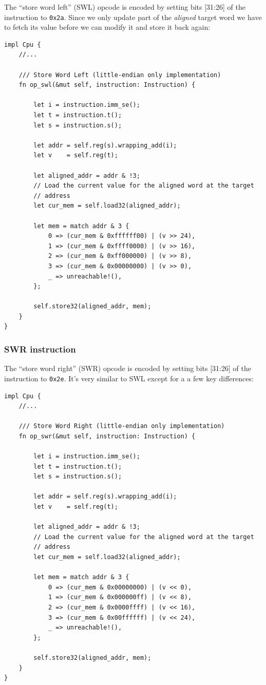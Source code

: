 \documentclass[a4paper]{article}
\newcommand{\code}[1] {\texttt{#1}}
\begin{document}
The ``store word left'' (SWL) opcode is encoded by setting bits
[31:26] of the instruction to \code{0x2a}. Since we only update part
of the \emph{aligned} target word we have to fetch its value before we
can modify it and store it back again:

\begin{lstlisting}
impl Cpu {
    //...

    /// Store Word Left (little-endian only implementation)
    fn op_swl(&mut self, instruction: Instruction) {

        let i = instruction.imm_se();
        let t = instruction.t();
        let s = instruction.s();

        let addr = self.reg(s).wrapping_add(i);
        let v    = self.reg(t);

        let aligned_addr = addr & !3;
        // Load the current value for the aligned word at the target
        // address
        let cur_mem = self.load32(aligned_addr);

        let mem = match addr & 3 {
            0 => (cur_mem & 0xffffff00) | (v >> 24),
            1 => (cur_mem & 0xffff0000) | (v >> 16),
            2 => (cur_mem & 0xff000000) | (v >> 8),
            3 => (cur_mem & 0x00000000) | (v >> 0),
            _ => unreachable!(),
        };

        self.store32(aligned_addr, mem);
    }
}
\end{lstlisting}

\subsubsection{SWR instruction}

The ``store word right'' (SWR) opcode is encoded by setting bits
[31:26] of the instruction to \code{0x2e}. It's very similar to SWL
except for a a few key differences:

\begin{lstlisting}
impl Cpu {
    //...

    /// Store Word Right (little-endian only implementation)
    fn op_swr(&mut self, instruction: Instruction) {

        let i = instruction.imm_se();
        let t = instruction.t();
        let s = instruction.s();

        let addr = self.reg(s).wrapping_add(i);
        let v    = self.reg(t);

        let aligned_addr = addr & !3;
        // Load the current value for the aligned word at the target
        // address
        let cur_mem = self.load32(aligned_addr);

        let mem = match addr & 3 {
            0 => (cur_mem & 0x00000000) | (v << 0),
            1 => (cur_mem & 0x000000ff) | (v << 8),
            2 => (cur_mem & 0x0000ffff) | (v << 16),
            3 => (cur_mem & 0x00ffffff) | (v << 24),
            _ => unreachable!(),
        };

        self.store32(aligned_addr, mem);
    }
}
\end{lstlisting}
\end{document}
